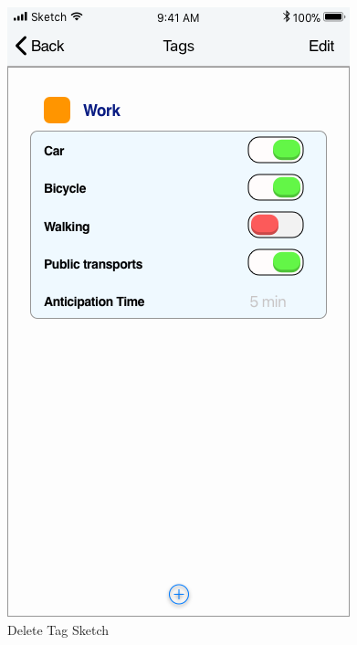 \begin{figure}[H]
	\hspace{0.5cm}
	\includegraphics[scale=0.23]{Images/Interface/Tags/8_tags+work}
	\caption{Delete Tag Sketch}
\end{figure}